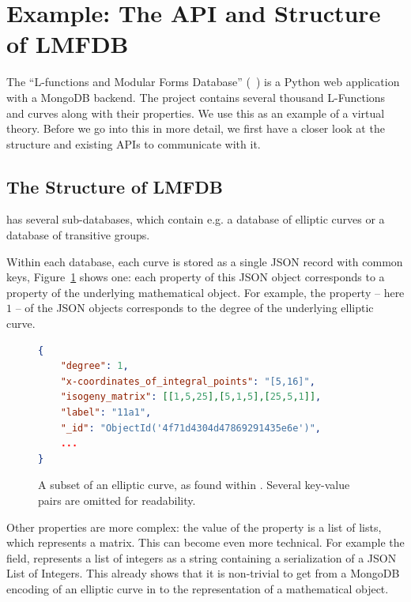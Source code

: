 \section{Example: The API and Structure of LMFDB}\label{sec:sota}

The ``L-functions and Modular Forms Database'' (\lmfdb~\cite{lmfdb}) is a Python web application with a MongoDB backend. 
The project contains several thousand L-Functions and curves along with their properties. 
We use this as an example of a virtual theory. 
Before we go into this in more detail, we first have a closer look at the structure and existing APIs to communicate with it.

\subsection{The Structure of LMFDB}\label{sec:sota:struct}

\lmfdb has several sub-databases, which contain e.g. a database of elliptic curves or a database of transitive groups. 

Within each database, each curve is stored as a single JSON record with common keys, Figure~\ref{fig:lmfdbexample} shows one: each property of this JSON object corresponds to a property of the underlying mathematical object. 
For example, the  property -- here $1$ -- of the JSON objects corresponds to the degree of the underlying elliptic curve. 

\begin{figure}[ht]\centering
\begin{lstlisting}[language=json]
{
    "degree": 1,
    "x-coordinates_of_integral_points": "[5,16]",
    "isogeny_matrix": [[1,5,25],[5,1,5],[25,5,1]],
    "label": "11a1",
    "_id": "ObjectId('4f71d4304d47869291435e6e')",
    ...
}
\end{lstlisting}\vspace*{-1.5em}
  \caption[An elliptic curve from \lmfdb]{
    A subset of an elliptic curve, as found within \lmfdb. 
    Several key-value pairs are omitted for readability. 
  }
  \label{fig:lmfdbexample}
\end{figure}

Other properties are more complex: the value of the  property is a list of lists, which represents a matrix. 
This can become even more technical. 
For example the  field, \lmfdb represents a list of integers as a string containing a serialization of a JSON List of Integers. 
This already shows that it is non-trivial to get from a MongoDB encoding of an elliptic curve in \lmfdb to the representation of a mathematical object. 


